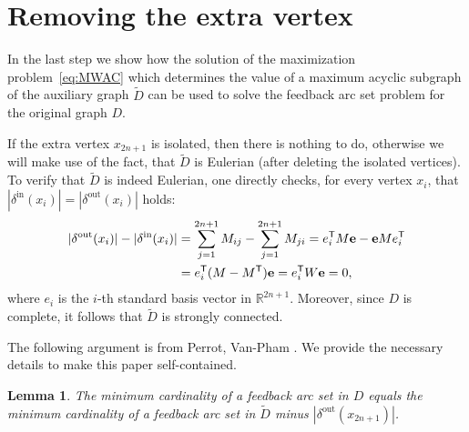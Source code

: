 \documentclass{amsart}
\newtheorem{lemma}[defin]{Lemma}
\newcommand{\R}{\mathbb{R}}
\newcommand{\deltain}{\delta^{\mathrm{in}}}
\newcommand{\deltaout}{\delta^{\mathrm{out}}}
\begin{document}
%
%
%

\section{Removing the extra vertex}
\label{sec:cleaning-up}

In the last step we show how the solution of the maximization
problem~\eqref{eq:MWAC} which determines the value of a maximum
acyclic subgraph of the auxiliary graph $\tilde{D}$ can be
used to solve the feedback arc set problem for the original graph $D$. 

If the extra vertex $x_{2n+1}$ is isolated, then there is nothing to do, otherwise we will
make use of the fact, that $\tilde{D}$ is Eulerian (after deleting the isolated vertices). To verify that $\tilde{D}$ is indeed Eulerian, 
one directly checks, for every vertex $x_i$, that $|\deltain(x_i)| = |\deltaout(x_i)|$ holds:
\[
\begin{split}
|\deltaout(x_i)| - |\deltain(x_i)| & =
\sum_{j=1}^{2n+1} M_{ij} - \sum_{j=1}^{2n+1} M_{ji}  
= e_i^{\sf T} M \mathbf{e} - \mathbf{e} M e_i^{\sf T} \\
& = e_i^{\sf T} (M - M^{\sf T}) \mathbf{e} = e_i^{\sf T} W \mathbf{e} = 0,
\end{split}
\]
where $e_i$ is the $i$-th standard basis vector in $\R^{2n+1}$.
Moreover, since $D$ is complete, it follows that $\tilde{D}$ is strongly connected.

\smallskip

The following argument is from Perrot, Van-Pham \cite[Section
3]{Perrot-Van-Pham-2015}. We provide the necessary details to make
this paper self-contained.

\begin{lemma}
\label{lem:Eulerian}
 The minimum cardinality of a feedback arc set in $D$
  equals the minimum cardinality of a feedback arc set in $\tilde{D}$
  minus $|\deltaout(x_{2n+1})|$.
\end{lemma}
\end{document}

